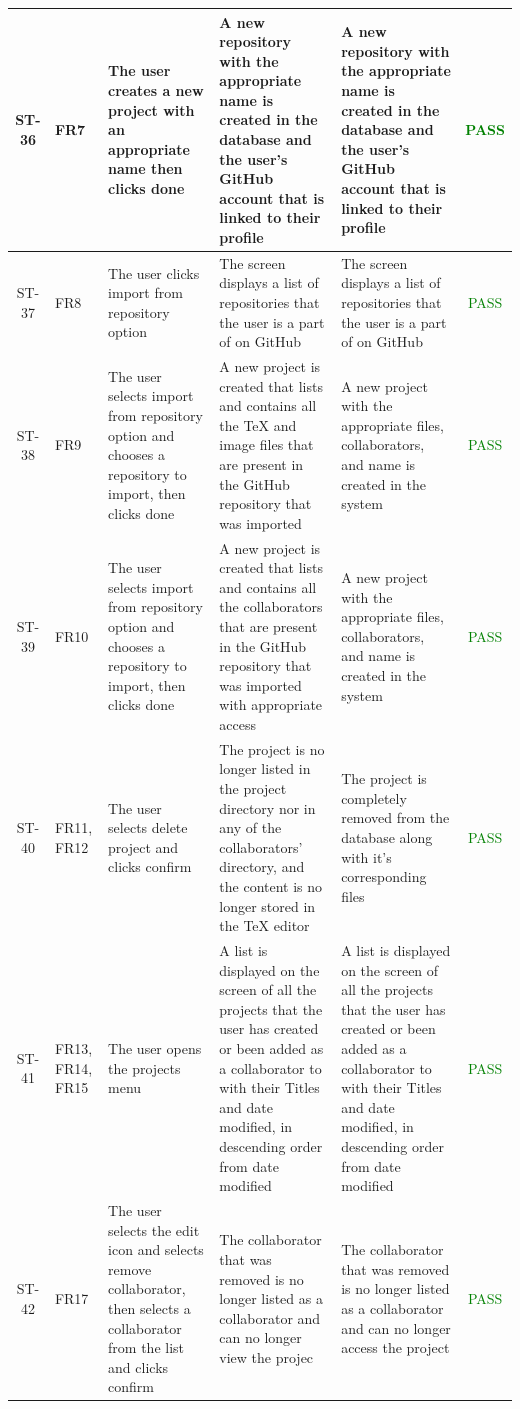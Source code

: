 \documentclass[12pt, titlepage]{article}
\begin{document}
\begin{center}
\begin{longtable}{|c|p{1cm}|p{2.7cm}|p{3cm}|p{3cm}|c|}
			\hline
			ST-36 & FR7 & The user creates a new project with an appropriate name then clicks done & A new repository with the appropriate name is created in the database and the user's GitHub account that is linked to their profile & A new repository with the appropriate name is created in the database and the user's GitHub account that is linked to their profile  & \textcolor{green}{PASS}\\
			\hline
			ST-37 & FR8 & The user clicks import from repository option & The screen displays a list of repositories that the user is a part of on GitHub & The screen displays a list of repositories that the user is a part of on GitHub & \textcolor{green}{PASS}\\
			\hline
			ST-38 & FR9 & The user selects import from repository option and chooses a repository to import, then clicks done & A new project is created that lists and contains all the TeX and image files that are present in the GitHub repository that was imported & A new project with the appropriate files, collaborators, and name is created in the system  & \textcolor{green}{PASS}\\
			\hline
			ST-39 & FR10 & The user selects import from repository option and chooses a repository to import, then clicks done &  A new project is created that lists and contains all the collaborators that are present in the GitHub repository that was imported with appropriate access & A new project with the appropriate files, collaborators, and name is created in the system  & \textcolor{green}{PASS}\\
			\hline
			ST-40 & FR11, FR12 & The user selects delete project and clicks confirm & The project is no longer listed in the project directory nor in any of the collaborators' directory, and the content is no longer stored in the TeX editor & The project is completely removed from the database along with it's corresponding files & \textcolor{green}{PASS}\\
			\hline
			ST-41 & FR13, FR14, FR15 & The user opens the projects menu & A list is displayed on the screen of all the projects that the user has created or been added as a collaborator to with their Titles and date modified, in descending order from date modified & A list is displayed on the screen of all the projects that the user has created or been added as a collaborator to with their Titles and date modified, in descending order from date modified  & \textcolor{green}{PASS}\\
			\hline
			ST-42 & FR17 &  The user selects the edit icon and selects remove collaborator, then selects a collaborator from the list and clicks confirm & The collaborator that was removed is no longer listed as a collaborator and can no longer view the projec & The collaborator that was removed is no longer listed as a collaborator and can no longer access the project & \textcolor{green}{PASS}\\
			\hline
		\end{longtable}
	\end{center}
	
\end{document}
